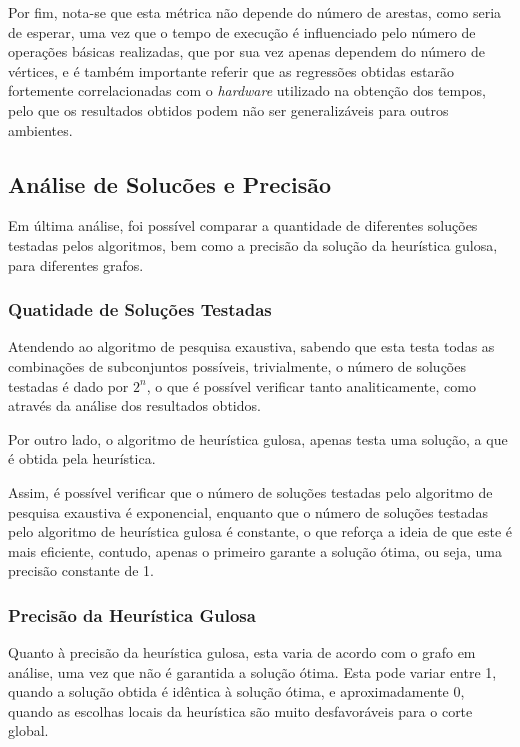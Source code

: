 \documentclass[mirror]{revdetua}
\begin{document}
Por fim, nota-se que esta métrica não depende do número de arestas, como seria de esperar, uma vez que o tempo de execução é influenciado pelo número de operações básicas realizadas, que por sua vez apenas dependem do número de vértices, e é também importante referir que as regressões obtidas estarão fortemente correlacionadas com o \textit{hardware} utilizado na obtenção dos tempos, pelo que os resultados obtidos podem não ser generalizáveis para outros ambientes.

\subsection{Análise de Solucões e Precisão}

Em última análise, foi possível comparar a quantidade de diferentes soluções testadas pelos algoritmos, bem como a precisão da solução da heurística gulosa, para diferentes grafos.

\subsubsection{Quatidade de Soluções Testadas}

Atendendo ao algoritmo de pesquisa exaustiva, sabendo que esta testa todas as combinações de subconjuntos possíveis, trivialmente, o número de soluções testadas é dado por $2^n$, o que é possível verificar tanto analiticamente, como através da análise dos resultados obtidos.

Por outro lado, o algoritmo de heurística gulosa, apenas testa uma solução, a que é obtida pela heurística.

Assim, é possível verificar que o número de soluções testadas pelo algoritmo de pesquisa exaustiva é exponencial, enquanto que o número de soluções testadas pelo algoritmo de heurística gulosa é constante, o que reforça a ideia de que este é mais eficiente, contudo, apenas o primeiro garante a solução ótima, ou seja, uma precisão constante de 1.

\subsubsection{Precisão da Heurística Gulosa}

Quanto à precisão da heurística gulosa, esta varia de acordo com o grafo em análise, uma vez que não é garantida a solução ótima. Esta pode variar entre 1, quando a solução obtida é idêntica à solução ótima, e aproximadamente 0, quando as escolhas locais da heurística são muito desfavoráveis para o corte global.
\end{document}
